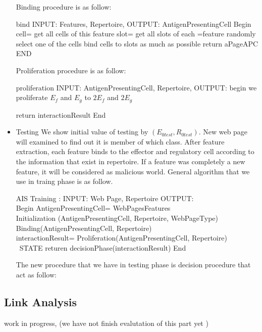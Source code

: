 \documentclass{llncs}
\begin{document}
\begin{itemize}
Binding procedure is as follow: 
\begin{algorithmic}
\STATE bind INPUT: Features, Repertoire, OUTPUT: AntigenPresentingCell
 \STATE Begin      
\STATE cell= get all cells of this feature
\STATE slot= get all slots of each =feature
\STATE randomly select one of the cells
\STATE bind cells to slots as much as possible
\ENDFOR
\STATE return aPageAPC
\STATE END
\end{algorithmic}
Proliferation procedure is as follow:
\begin{algorithmic}
\STATE proliferation INPUT: AntigenPresentingCell, Repertoire, OUTPUT:
\STATE begin
\STATE we proliferate $E_f$ and $E_g$ to $2E_f$ and $2E_g$
\ENDIF



\ENDFOR
\STATE  return interactionResult  
\STATE End
\end{algorithmic}

      
\item Testing
We show initial value of testing by $(E_{0test} , R_{0test })$.  New web page will examined to find out it is member of which class.  After feature extraction, each feature binds to the effector and regulatory cell according to the information that exist in repertoire.  If a feature was completely a new feature,  it will be considered as malicious world. 
General algorithm that we use in traing phase is as follow.\\
\begin{algorithmic}
\STATE AIS Training :  INPUT: Web Page, Repertoire OUTPUT:\\
\STATE Begin 
\STATE  AntigenPresentingCell= WebPagesFeatures\\
\STATE Initialization (AntigenPresentingCell, Repertoire, WebPageType)\\
\STATE Binding(AntigenPresentingCell, Repertoire)\\
\STATE interactionResult=  Proliferation(AntigenPresentingCell, Repertoire)\\
\ STATE returen decisionPhase(interactionResult)
\STATE End\\
\end{algorithmic}
The new procedure that we have in testing phase is decision procedure that act as follow:\\
\end{itemize}

\subsection{Link Analysis}
work in progress, (we have not finish evalutation of  this part yet )
\end{document}
